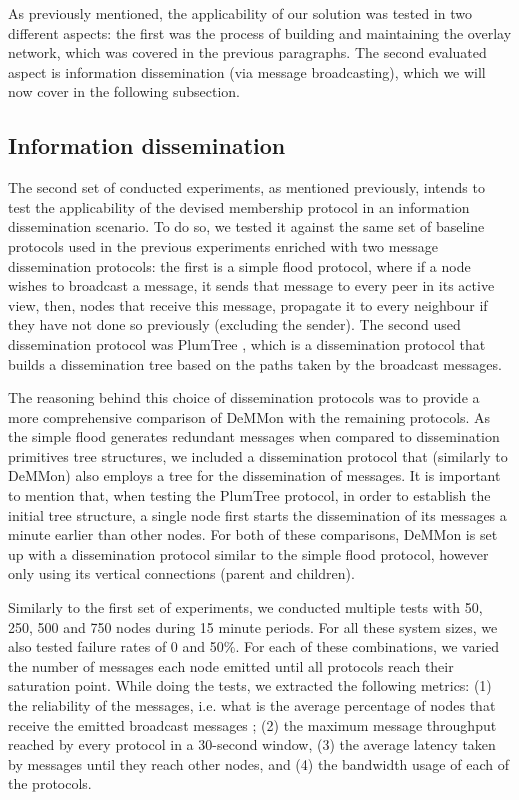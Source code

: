 As previously mentioned, the applicability of our solution was tested in two different aspects: the first was the process of building and maintaining the overlay network, which was covered in the previous paragraphs. The second evaluated aspect is information dissemination (via message broadcasting), which we will now cover in the following subsection.

\subsection{Information dissemination} \label{results:inf_diss}

The second set of conducted experiments, as mentioned previously, intends to test the applicability of the devised membership protocol in an information dissemination scenario. To do so, we tested it against the same set of baseline protocols used in the previous experiments enriched with two message dissemination protocols: the first is a simple flood protocol, where if a node wishes to broadcast a message, it sends that message to every peer in its active view, then, nodes that receive this message, propagate it to every neighbour if they have not done so previously (excluding the sender). The second used dissemination protocol was PlumTree \cite{plumTree}, which is a dissemination protocol that builds a dissemination tree based on the paths taken by the broadcast messages.

The reasoning behind this choice of dissemination protocols was to provide a more comprehensive comparison of DeMMon with the remaining protocols. As the simple flood generates redundant messages when compared to dissemination primitives tree structures, we included a dissemination protocol that (similarly to DeMMon) also employs a tree for the dissemination of messages. It is important to mention that, when testing the PlumTree protocol, in order to establish the initial tree structure, a single node first starts the dissemination of its messages a minute earlier than other nodes. For both of these comparisons, DeMMon is set up with a dissemination protocol similar to the simple flood protocol, however only using its vertical connections (parent and children).

Similarly to the first set of experiments, we conducted multiple tests with 50, 250, 500 and 750 nodes during 15 minute periods. For all these system sizes, we also tested failure rates of 0 and 50\%. For each of these combinations, we varied the number of messages each node emitted until all protocols reach their saturation point. While doing the tests, we extracted the following metrics: (1) the reliability of the messages, i.e. what is the average percentage of nodes that receive the emitted broadcast messages ; (2) the maximum message throughput reached by every protocol in a 30-second window, (3) the average latency taken by messages until they reach other nodes, and (4) the bandwidth usage of each of the protocols. 

